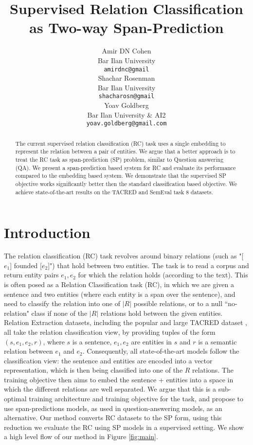 \documentclass[11pt]{article}
\title{Supervised Relation Classification as Two-way Span-Prediction}
\author{Amir DN Cohen \\
  Bar Ilan University \\
  \texttt{amirdnc@gmail} \\\And
  Shachar Rosenman \\
  Bar Ilan University \\
  \texttt{shacharosn@gmail}\\\And
  Yoav Goldberg \\
  Bar Ilan University \& AI2\\
  \texttt{yoav.goldberg@gmail.com} \\}
\date{}
\begin{document}
\maketitle
\begin{abstract}
The current supervised relation classification (RC) task uses a single embedding to represent the relation between a pair of entities. We argue that a better approach is to treat the RC task as span-prediction (SP) problem, similar to Question answering (QA). We present a span-prediction based system for RC and evaluate its performance compared to the embedding based system. We demonstrate that the supervised SP objective works significantly better then the standard classification based objective. We achieve state-of-the-art results on the TACRED and SemEval task 8 datasets.
\end{abstract}
\section{Introduction}
The relation classification (RC) task revolves around binary relations (such as "[$e_1$] founded [$e_2$]") that hold between two entities. The task is to read a corpus and return entity pairs $e_1, e_2$ for which the relation holds (according to the text). This is often posed as a Relation Classification task (RC), in which we are given a sentence and two entities (where each entity is a span over the sentence), and need to classify the relation into one of $|R|$ possible relations, or to a null ``no-relation" class if none of the $|R|$ relations hold between the given entities. Relation Extraction datasets, including the popular and large TACRED dataset \cite{Zhang}, all take the relation classification view, by providing tuples of the form $(s, e_1, e_2, r)$, where $s$ is a sentence, $e_1, e_2$ are entities in $s$ and $r$ is a semantic relation between $e_1$ and $e_2$. Consequently, all state-of-the-art models follow the classification view: the sentence and entities are encoded into a vector representation, which is then being classified into one of the $R$ relations. The training objective then aims to embed the sentence + entities into a space in which the different relations are well separated.
We argue that this is a sub-optimal training architecture and training objective for the task, and propose to use span-predictions models, as used in question-answering models, as an alternative.
Our method converts RC datasets to the SP form, using this reduction we evaluate the RC using SP models in a supervised setting. We show a high level flow of our method in Figure \ref{fig:main}.
\end{document}
